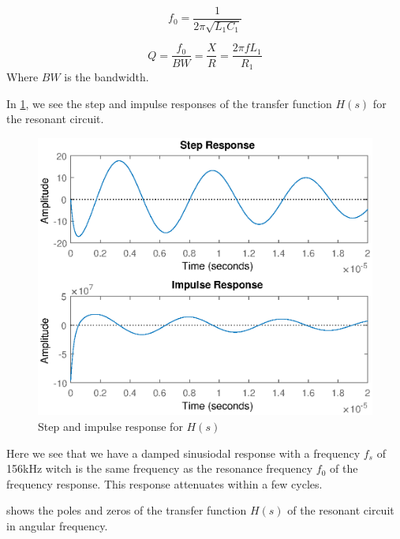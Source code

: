 \begin{equation} \label{eq:f0}
    f_0 = \frac{1}{2 \pi \sqrt{L_1 C_1}}
\end{equation}

\begin{equation} \label{eq:Q}
    Q = \frac{f_0}{BW} = \frac{X}{R} = \frac{2 \pi f L_1}{R_1}
\end{equation}
Where $BW$ is the bandwidth.

In \cref{fig:step}, we see the step and impulse responses of the transfer function $H(s)$ for the resonant circuit.

\begin{figure}[H]
    \centering
    \includegraphics[width=\textwidth]{img/CoilRigResponse.eps}
    \caption{Step and impulse response for $H(s)$}
    \label{fig:step}
\end{figure}

Here we see that we have a damped sinusiodal response with a frequency $f_s$ of 156kHz witch is the same frequency as the resonance frequency $f_0$ of the frequency response. This response attenuates within a few cycles.

 shows the poles and zeros of the transfer function $H(s)$ of the resonant circuit in angular frequency.

